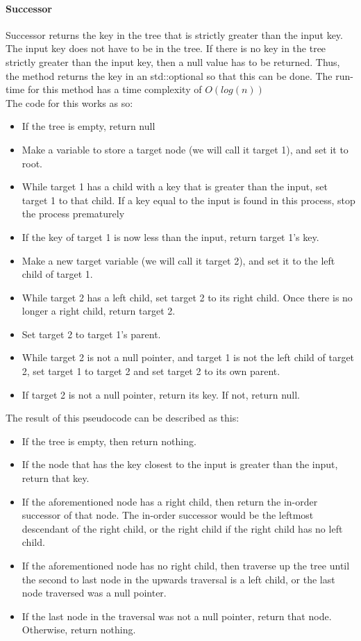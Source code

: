 \documentclass{article}
\begin{document}
\paragraph{Successor}

\noindent
Successor returns the key in the tree that is strictly greater than the input key. The input key does not have to be in the tree. If there is no key in the tree strictly greater than the input key, then a null value has to be returned. Thus, the method returns the key in an std::optional so that this can be done. The run-time for this method has a time complexity of $O(log(n))$
\\

\noindent
The code for this works as so:

\begin{itemize}
    \item If the tree is empty, return null
    \item Make a variable to store a target node (we will call it target 1), and set it to root.
    \item While target 1 has a child with a key that is greater than the input, set target 1 to that child. If a key equal to the input is found in this process, stop the process prematurely
    \item If the key of target 1 is now less than the input, return target 1’s key.
    \item Make a new target variable (we will call it target 2), and set it to the left child of target 1.
    \item While target 2 has a left child, set target 2 to its right child. Once there is no longer a right child, return target 2.
    \item Set target 2 to target 1’s parent.
    \item While target 2 is not a null pointer, and target 1 is not the left child of target 2, set target 1 to target 2 and set target 2 to its own parent.
    \item If target 2 is not a null pointer, return its key. If not, return null.
\end{itemize}

\noindent
The result of this pseudocode can be described as this:

\begin{itemize}
    \item If the tree is empty, then return nothing.
    \item If the node that has the key closest to the input is greater than the input, return that key.
    \item If the aforementioned node has a right child, then return the in-order successor of that node. The in-order successor would be the leftmost descendant of the right child, or the right child if the right child has no left child.
    \item If the aforementioned node has no right child, then traverse up the tree until the second to last node in the upwards traversal is a left child, or the last node traversed was a null pointer.
    \item If the last node in the traversal was not a null pointer, return that node. Otherwise, return nothing.
\end{itemize}
\end{document}
